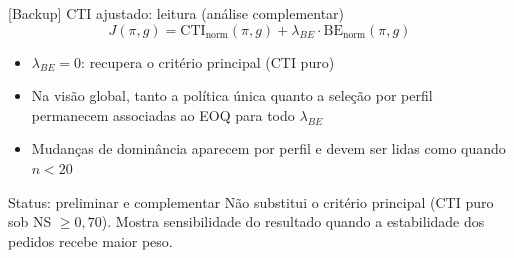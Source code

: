 \begin{frame}[noframenumbering]{[Backup] CTI ajustado: leitura (análise complementar)}
  \[
    J(\pi,g) = \mathrm{CTI}_{\text{norm}}(\pi,g) + \lambda_{BE}\cdot \mathrm{BE}_{\text{norm}}(\pi,g)
  \]
  \begin{itemize}
    \small
    \item $\lambda_{BE}=0$: recupera o critério principal (CTI puro)
    \item Na visão global, tanto a política única quanto a seleção por perfil
      permanecem associadas ao EOQ para todo $\lambda_{BE}$
    \item Mudanças de dominância aparecem por perfil e devem ser lidas como
       quando $n<20$
  \end{itemize}
  \vfill
  \begin{alertblock}{Status: preliminar e complementar}
    \footnotesize Não substitui o critério principal (CTI puro sob
    NS $\geq 0{,}70$). Mostra sensibilidade do resultado quando a
    estabilidade dos pedidos recebe maior peso.
  \end{alertblock}
\end{frame}
